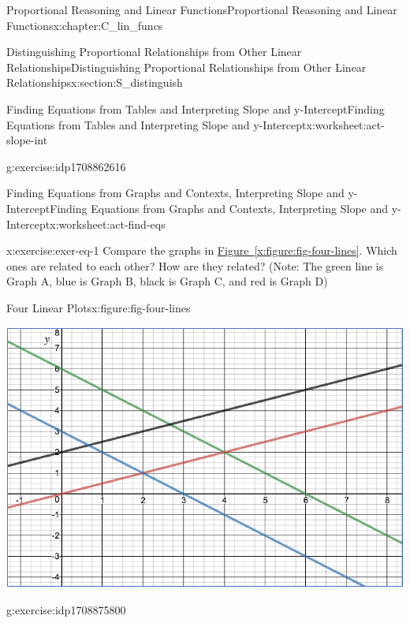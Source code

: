 \documentclass[oneside,10pt,]{book}
\newcommand{\xreffont}{\relax}
\numberwithin{equation}{chapter}
\begin{document}
\begin{chapterptx}{Proportional Reasoning and Linear Functions}{}{Proportional Reasoning and Linear Functions}{}{}{x:chapter:C_lin_funcs}
\begin{sectionptx}{Distinguishing Proportional Relationships from Other Linear Relationships}{}{Distinguishing Proportional Relationships from Other Linear Relationships}{}{}{x:section:S_distinguish}
\begin{worksheet-subsection}{Finding Equations from Tables and Interpreting Slope and y-Intercept}{}{Finding Equations from Tables and Interpreting Slope and y-Intercept}{}{}{x:worksheet:act-slope-int}
\begin{divisionexercise}{8}{}{}{g:exercise:idp1708862616}
\begin{enumerate}[font=\bfseries,label=(\alph*),ref=\alph*]
\end{enumerate}
\end{divisionexercise}%
\end{worksheet-subsection}
\restoregeometry
%
%
\typeout{************************************************}
\typeout{************************************************}
%
\begin{worksheet-subsection}{Finding Equations from Graphs and Contexts, Interpreting Slope and y-Intercept}{}{Finding Equations from Graphs and Contexts, Interpreting Slope and y-Intercept}{}{}{x:worksheet:act-find-eqs}
\begin{divisionexercise}{1}{}{}{x:exercise:exer-eq-1}%
Compare the graphs in \hyperref[x:figure:fig-four-lines]{Figure~{\xreffont\ref{x:figure:fig-four-lines}}}. Which ones are related to each other? How are they related? (Note: The green line is Graph A, blue is Graph B, black is Graph C, and red is Graph D)%
\begin{figureptx}{Four Linear Plots}{x:figure:fig-four-lines}{}%
\begin{image}{0.1}{0.8}{0.1}%
\includegraphics[width=\linewidth]{external/four-lines.pdf}
\end{image}%
\tcblower
\end{figureptx}%
\end{divisionexercise}%
\begin{divisionexercise}{2}{}{}{g:exercise:idp1708875800}%
\begin{enumerate}[font=\bfseries,label=(\alph*),ref=\alph*]

\end{enumerate}
\end{divisionexercise}
\end{worksheet-subsection}
\end{sectionptx}
\end{chapterptx}
\end{document}
